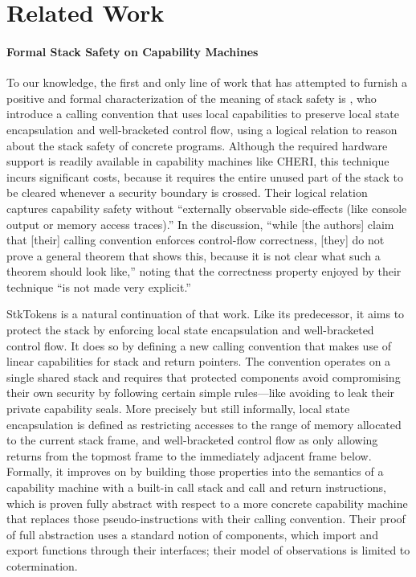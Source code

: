 \documentclass[acmsmall,review,anonymous]{acmart}\settopmatter{printfolios=true,printccs=false,printacmref=false}
\begin{document}
{{    
\section{Related Work}
\label{sec:relwork}


\paragraph{Formal Stack Safety on Capability Machines}
%
To our knowledge, the first and only line of work that has attempted
to furnish a positive and formal characterization of the meaning of
stack safety is \citet{Skorstengaard+19b}, who introduce a calling
convention that uses local capabilities to preserve local state
encapsulation and well-bracketed control flow, using a logical
relation to reason about the stack safety of concrete
programs. Although the required hardware support is readily available
in capability machines like CHERI, this technique incurs significant
costs, because it requires the entire unused part of the stack to be
cleared whenever a security boundary is crossed. Their logical
relation captures capability safety without ``externally observable
side-effects (like console output or memory access traces).'' In the
discussion, ``while [the authors] claim that [their] calling
convention enforces control-flow correctness, [they] do not prove a
general theorem that shows this, because it is not clear what such a
theorem should look like,'' noting that the correctness property
enjoyed by their technique ``is not made very explicit.''

StkTokens \citep{Skorstengaard+19} is a natural continuation of that work. Like
its predecessor, it aims to protect the stack by enforcing local state
encapsulation and well-bracketed control flow. It does so by defining a new
calling convention that makes use of linear capabilities for stack and return
pointers. The convention operates on a single shared stack and requires that
protected components avoid compromising their own security by following certain
simple rules---like avoiding to leak their private capability seals. More
precisely but still informally, local state encapsulation is defined as
restricting accesses to the range of memory allocated to the current stack
frame, and well-bracketed control flow as only allowing returns from the topmost
frame to the immediately adjacent frame below. Formally, it improves on
\citet{Skorstengaard+19b} by building those properties into the semantics of a
capability machine with a built-in call stack and call and return instructions,
which is proven fully abstract with respect to a more concrete capability
machine that replaces those pseudo-instructions with their calling convention.
Their proof of full abstraction uses a standard notion of components, which
import and export functions through their interfaces; their model of
observations is limited to cotermination.

}}
\end{document}
